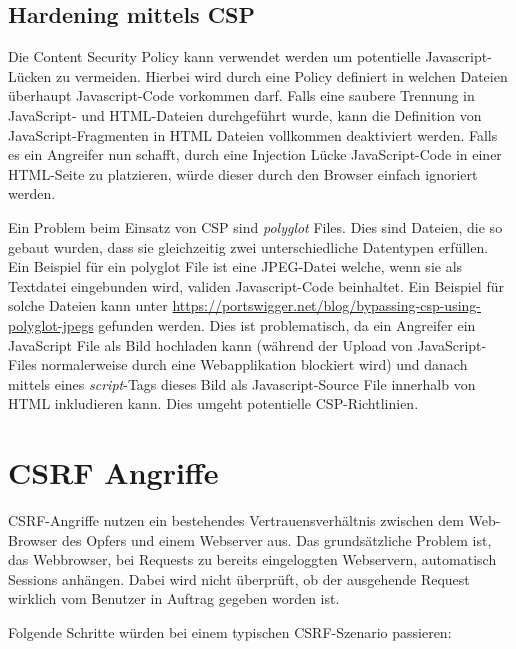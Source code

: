 \subsection{Hardening mittels CSP}

Die Content Security Policy kann verwendet werden um potentielle Javascript-Lücken zu vermeiden. Hierbei wird durch eine Policy definiert in welchen Dateien überhaupt Javascript-Code vorkommen darf. Falls eine saubere Trennung in JavaScript- und HTML-Dateien durchgeführt wurde, kann die Definition von JavaScript-Fragmenten in HTML Dateien vollkommen deaktiviert werden. Falls es ein Angreifer nun schafft, durch eine Injection Lücke JavaScript-Code in einer HTML-Seite zu platzieren, würde dieser durch den Browser einfach ignoriert werden.

Ein Problem beim Einsatz von CSP sind \textit{polyglot} Files. Dies sind Dateien, die so gebaut wurden, dass sie gleichzeitig zwei unterschiedliche Datentypen erfüllen. Ein Beispiel für ein polyglot File ist eine JPEG-Datei welche, wenn sie als Textdatei eingebunden wird, validen Javascript-Code beinhaltet. Ein Beispiel für solche Dateien kann unter \url{https://portswigger.net/blog/bypassing-csp-using-polyglot-jpegs} gefunden werden. Dies ist problematisch, da ein Angreifer ein JavaScript File als Bild hochladen kann (während der Upload von JavaScript-Files normalerweise durch eine Webapplikation blockiert wird) und danach mittels eines \textit{script}-Tags dieses Bild als Javascript-Source File innerhalb von HTML inkludieren kann. Dies umgeht potentielle CSP-Richtlinien.

\section{CSRF Angriffe}

CSRF-Angriffe nutzen ein bestehendes Vertrauensverhältnis zwischen dem Web-Browser des Opfers und einem Webserver aus. Das grundsätzliche Problem ist, das Webbrowser, bei Requests zu bereits eingeloggten Webservern, automatisch Sessions anhängen. Dabei wird nicht überprüft, ob der ausgehende Request wirklich vom Benutzer in Auftrag gegeben worden ist.

Folgende Schritte würden bei einem typischen CSRF-Szenario passieren:

